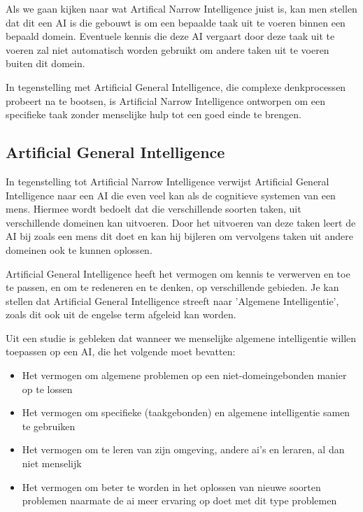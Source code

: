 Als we gaan kijken naar wat Artifical Narrow Intelligence juist is, kan men stellen dat dit een AI is die gebouwt is om een bepaalde taak uit te voeren binnen een bepaald domein. Eventuele kennis die deze AI vergaart door deze taak uit te voeren zal niet automatisch worden gebruikt om andere taken uit te voeren buiten dit domein. 

In tegenstelling met Artificial General Intelligence, die complexe denkprocessen probeert na te bootsen, is Artificial Narrow Intelligence ontworpen om een specifieke taak zonder menselijke hulp tot een goed einde te brengen.  

\subsection{Artificial General Intelligence}

In tegenstelling tot Artificial Narrow Intelligence verwijst Artificial General Intelligence naar een AI die even veel kan als de cognitieve systemen van een mens. Hiermee wordt bedoelt dat die verschillende soorten taken, uit verschillende domeinen kan uitvoeren. Door het uitvoeren van deze taken leert de AI bij zoals een mens dit doet en kan hij bijleren om vervolgens taken uit andere domeinen ook te kunnen oplossen. 

Artificial General Intelligence heeft het vermogen om kennis te verwerven en toe te passen, en om te redeneren en te denken, op verschillende gebieden. Je kan stellen dat Artificial General Intelligence streeft naar 'Algemene Intelligentie', zoals dit ook uit de engelse term afgeleid kan worden. 

Uit een studie is gebleken dat wanneer we menselijke algemene intelligentie willen toepassen op een AI, die het volgende moet bevatten: \linebreak

\begin{itemize}
    \item Het vermogen om algemene problemen op een niet-domeingebonden manier op te lossen
    \item Het vermogen om specifieke (taakgebonden) en algemene intelligentie samen te gebruiken
    \item Het vermogen om te leren van zijn omgeving, andere ai's en leraren, al dan niet menselijk
    \item Het vermogen om beter te worden in het oplossen van nieuwe soorten problemen naarmate de ai meer ervaring op doet met dit type problemen
\end{itemize}

